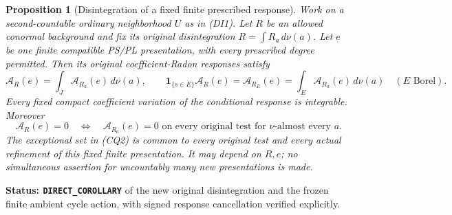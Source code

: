 \documentclass[11pt,a4paper]{article}
\numberwithin{equation}{section}
\newtheorem{proposition}[theorem]{Proposition}
\theoremstyle{definition}
\theoremstyle{remark}
\begin{document}
\begin{proposition}[Disintegration of a fixed finite prescribed response]
\label{prop:r12-conditional-PS-response}
Work on a second-countable ordinary neighborhood \(U\) as in (DI1).
Let \(R\) be an allowed conormal background and fix its original
disintegration \(R=\int R_a\,d\nu(a)\). Let \(e\) be one finite
compatible PS/PL presentation, with every prescribed degree permitted.
Then its original coefficient-Radon responses satisfy
\[
 \mathcal A_R(e)=\int_J\mathcal A_{R_a}(e)\,d\nu(a),\qquad
 \mathbf1_{\{s\in E\}}\mathcal A_R(e)
       =\mathcal A_{R_E}(e)
       =\int_E\mathcal A_{R_a}(e)\,d\nu(a)
       \quad(E\text{ Borel}).
 \tag{CQ1}
\]
Every fixed compact coefficient variation of the conditional
response is integrable. Moreover
\[
 \mathcal A_R(e)=0
   \quad\Longleftrightarrow\quad
 \mathcal A_{R_a}(e)=0\text{ on every original test for }\nu
       \text{-almost every }a.
 \tag{CQ2}
\]
The exceptional set in (CQ2) is common to every original test and
every actual refinement of this fixed finite presentation. It may
depend on \(R,e\); no simultaneous assertion for uncountably many
new presentations is made.
\end{proposition}

\noindent\textbf{Status: \texttt{DIRECT\_COROLLARY}} of the new
original disintegration and the frozen finite ambient cycle action,
with signed response cancellation verified explicitly.
\end{document}
